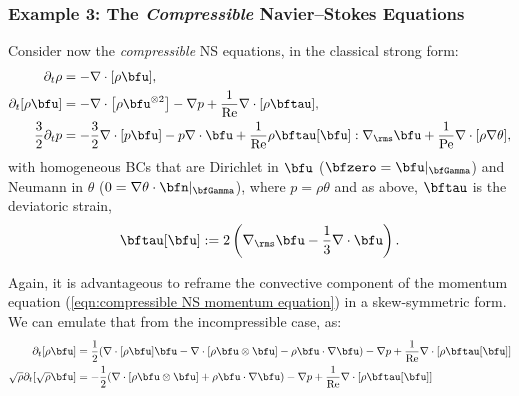 \subsubsection*{Example 3: The \emph{Compressible} Navier--Stokes Equations}
    Consider now the \emph{compressible} NS equations, in the classical strong form:
    \begin{align}
                \partial_{t}\rho  &=  - \nabla\cdot[\rho\bfu],  \label{eqn:compressible NS mass equation}  \\
          \partial_{t}[\rho\bfu]  &=  - \nabla\cdot\left[\rho\bfu^{\otimes 2}\right] - \nabla p + \frac{1}{\rmRe}\nabla\cdot[\rho\bftau],  \label{eqn:compressible NS momentum equation}  \\
        \frac{3}{2}\partial_{t}p  &=  - \frac{3}{2}\nabla\cdot[p\bfu] - p\nabla\cdot\bfu + \frac{1}{\rmRe}\rho\bftau[\bfu]:\nabla_{\rms}\bfu + \frac{1}{\rmPe}\nabla\cdot[\rho\nabla\theta],  \label{eqn:compressible NS energy equation}
    \end{align}
    with homogeneous BCs that are Dirichlet in $\bfu$ ($\bfzero  =  \bfu|_{\bfGamma}$) and Neumann in $\theta$ ($0  =  \nabla\theta\cdot\bfn|_{\bfGamma}$), where $p = \rho\theta$ and as above, $\bftau$ is the deviatoric strain,
    \begin{equation}
        \bftau[\bfu]  :=  2\left(\nabla_{\rms}\bfu - \frac{1}{3}\nabla\cdot\bfu\right).
    \end{equation}

    Again, it is advantageous to reframe the convective component of the momentum equation (\ref{eqn:compressible NS momentum equation}) in a skew-symmetric form. We can emulate that from the incompressible case, as:
    \begin{align}
        \partial_{t}[\rho\bfu]  &=  \frac{1}{2}(\nabla\cdot[\rho\bfu]\bfu - \nabla\cdot\left[\rho\bfu\otimes\bfu\right] - \rho\bfu\cdot\nabla\bfu) - \nabla p + \frac{1}{\rmRe}\nabla\cdot[\rho\bftau[\bfu]]  \\
        \sqrt{\rho}\partial_{t}[\sqrt{\rho}\bfu]  &=  - \frac{1}{2}(\nabla\cdot\left[\rho\bfu\otimes\bfu\right] + \rho\bfu\cdot\nabla\bfu) - \nabla p + \frac{1}{\rmRe}\nabla\cdot[\rho\bftau[\bfu]]  \label{eqn:compressible NS skew-symmetric momentum equation}  \\  
    \end{align}

